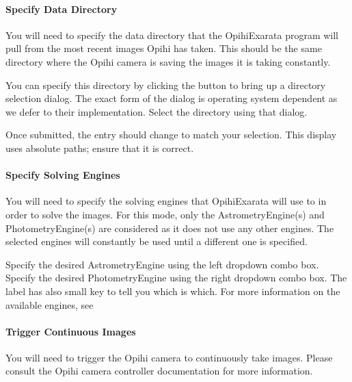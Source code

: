 \documentclass[letterpaper,11pt,english]{sphinxmanual}
\begin{document}
\paragraph{Specify Data Directory}
\label{\detokenize{user/automatic_mode:specify-data-directory}}
\sphinxAtStartPar
You will need to specify the data directory that the OpihiExarata program will
pull from the most recent images Opihi has taken. This should be the same
directory where the Opihi camera is saving the images it is taking constantly.

\sphinxAtStartPar
You can specify this directory by clicking the  button to
bring up a directory selection dialog. The exact form of the dialog is
operating system dependent as we defer to their implementation. Select the
directory using that dialog.

\sphinxAtStartPar
Once submitted, the  entry should change to match
your selection. This display uses absolute paths; ensure that it is correct.


\paragraph{Specify Solving Engines}
\label{\detokenize{user/automatic_mode:specify-solving-engines}}
\sphinxAtStartPar
You will need to specify the solving engines that OpihiExarata will use to in
order to solve the images. For this mode, only the AstrometryEngine(s) and
PhotometryEngine(s) are considered as it does not use any other engines. The
selected engines will constantly be used until a different one is specified.

\sphinxAtStartPar
Specify the desired AstrometryEngine using the left drop\sphinxhyphen{}down combo box.
Specify the desired PhotometryEngine using the right drop\sphinxhyphen{}down combo box.
The  label has also small key to tell you which is
which. For more information on the available engines, see
{\hyperref[\detokenize{technical/architecture/services_engines:technical-architecture-services-engines}]{}}


\paragraph{Trigger Continuous Images}
\label{\detokenize{user/automatic_mode:trigger-continuous-images}}
\sphinxAtStartPar
You will need to trigger the Opihi camera to continuously take images.
Please consult the Opihi camera controller documentation for more information.
\end{document}

